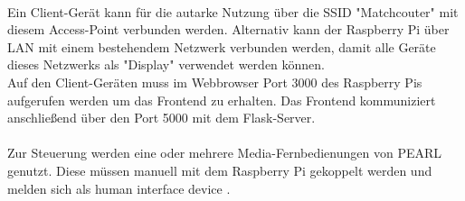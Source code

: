 \\
Ein Client-Gerät kann für die autarke Nutzung über die SSID "Matchcouter" mit diesem Access-Point verbunden werden. Alternativ kann der Raspberry Pi über LAN mit einem bestehendem Netzwerk verbunden werden, damit alle Geräte dieses Netzwerks als "Display" verwendet werden können. \\
Auf den Client-Geräten muss im Webbrowser Port 3000 des Raspberry Pis aufgerufen werden um das Frontend zu erhalten. Das Frontend kommuniziert anschließend über den Port 5000 mit dem Flask-Server.\\
\\
Zur Steuerung werden eine oder mehrere Media-Fernbedienungen von PEARL genutzt. Diese müssen manuell mit dem Raspberry Pi gekoppelt werden und melden sich als \glqq human interface device\grqq{} .
             